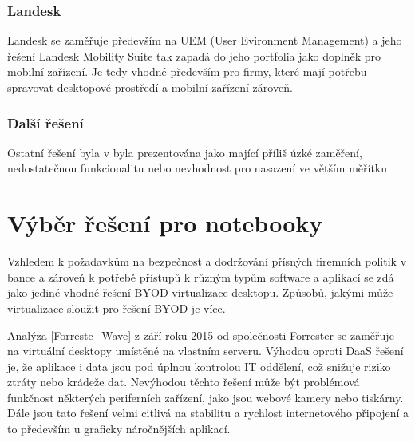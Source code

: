 \subsubsection{Landesk}
Landesk se zaměřuje především na UEM (User Evironment Management) a jeho řešení Landesk Mobility Suite tak zapadá do jeho portfolia jako doplněk pro mobilní zařízení. Je tedy vhodné především pro firmy, které mají potřebu spravovat desktopové prostředí a mobilní zařízení zároveň.

\subsubsection{Další řešení}
Ostatní řešení byla v  byla prezentována jako mající příliš úzké zaměření, nedostatečnou funkcionalitu nebo nevhodnost pro nasazení ve větším měřítku


\section{Výběr řešení pro notebooky}

Vzhledem k požadavkům na bezpečnost a dodržování přísných firemních politik v bance a zároveň k potřebě přístupů k různým typům software a aplikací se zdá jako jediné vhodné řešení BYOD virtualizace desktopu. Způsobů, jakými může virtualizace sloužit pro řešení BYOD je více.

Analýza \ref{Forreste_Wave} z září roku 2015 od společnosti Forrester se zaměřuje na virtuální desktopy umístěné na vlastním serveru. Výhodou oproti DaaS řešení je, že aplikace i data jsou pod úplnou kontrolou IT oddělení, což snižuje riziko ztráty nebo krádeže dat. Nevýhodou těchto řešení může být problémová funkčnost některých periferních zařízení, jako jsou webové kamery nebo tiskárny. Dále jsou tato řešení velmi citlivá na stabilitu a rychlost internetového připojení a to především u graficky náročnějších aplikací. 

